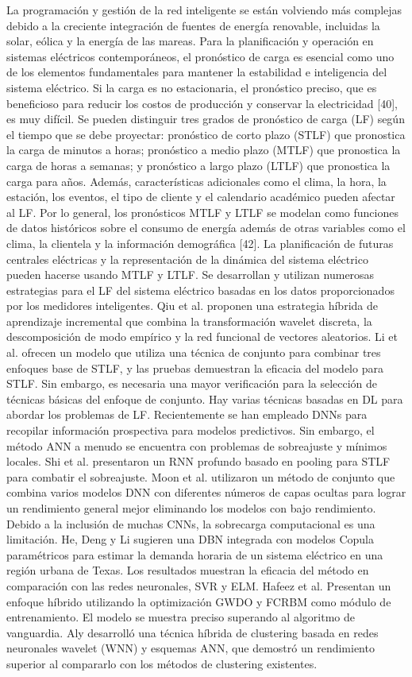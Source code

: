 \documentclass[crop=false]{standalone}
\begin{document}
La programación y gestión de la red inteligente se están volviendo más complejas debido a la creciente integración de fuentes de energía renovable, incluidas la solar, eólica y la energía de las mareas. Para la planificación y operación en sistemas eléctricos contemporáneos, el pronóstico de carga es esencial como uno de los elementos fundamentales para mantener la estabilidad e inteligencia del sistema eléctrico. Si la carga es no estacionaria, el pronóstico preciso, que es beneficioso para reducir los costos de producción y conservar la electricidad [40], es muy difícil.
Se pueden distinguir tres grados de pronóstico de carga (LF) según el tiempo que se debe proyectar: pronóstico de corto plazo (STLF) que pronostica la carga de minutos a horas; pronóstico a medio plazo (MTLF) que pronostica la carga de horas a semanas; y pronóstico a largo plazo (LTLF) que pronostica la carga para años. Además, características adicionales como el clima, la hora, la estación, los eventos, el tipo de cliente y el calendario académico pueden afectar al LF. Por lo general, los pronósticos MTLF y LTLF se modelan como funciones de datos históricos sobre el consumo de energía además de otras variables como el clima, la clientela y la información demográfica [42]. La planificación de futuras centrales eléctricas y la representación de la dinámica del sistema eléctrico pueden hacerse usando MTLF y LTLF. Se desarrollan y utilizan numerosas estrategias para el LF del sistema eléctrico basadas en los datos proporcionados por los medidores inteligentes.
Qiu et al. proponen una estrategia híbrida de aprendizaje incremental que combina la transformación wavelet discreta, la descomposición de modo empírico y la red funcional de vectores aleatorios.
Li et al.  ofrecen un modelo que utiliza una técnica de conjunto para combinar tres enfoques base de STLF, y las pruebas demuestran la eficacia del modelo para STLF. Sin embargo, es necesaria una mayor verificación para la selección de técnicas básicas del enfoque de conjunto.
Hay varias técnicas basadas en DL para abordar los problemas de LF. Recientemente se han empleado DNNs para recopilar información prospectiva para modelos predictivos. Sin embargo, el método ANN a menudo se encuentra con problemas de sobreajuste y mínimos locales. Shi et al. presentaron un RNN profundo basado en pooling para STLF para combatir el sobreajuste.
Moon et al. utilizaron un método de conjunto que combina varios modelos DNN con diferentes números de capas ocultas para lograr un rendimiento general mejor eliminando los modelos con bajo rendimiento.
Debido a la inclusión de muchas CNNs, la sobrecarga computacional es una limitación. He, Deng y Li sugieren una DBN integrada con modelos Copula paramétricos para estimar la demanda horaria de un sistema eléctrico en una región urbana de Texas. Los resultados muestran la eficacia del método en comparación con las redes neuronales, SVR y ELM. Hafeez et al. Presentan un enfoque híbrido utilizando la optimización GWDO y FCRBM como módulo de entrenamiento. El modelo se muestra preciso superando al algoritmo de vanguardia. Aly desarrolló una técnica híbrida de clustering basada en redes neuronales wavelet (WNN) y esquemas ANN, que demostró un rendimiento superior al compararlo con los métodos de clustering existentes.
\end{document}
